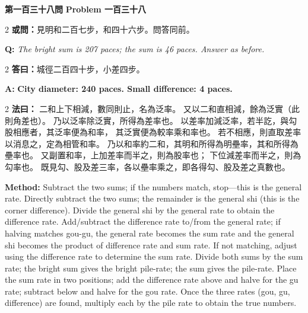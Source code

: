 \documentclass[11pt,a4paper]{article}
\newcommand{\wen}[1]{%
  \par\vspace{0.5em}%
  \noindent\textcolor{problemcolor}{\textbf{第#1問}}%
  \hfill\textcolor{problemcolor}{\textbf{Problem #1}}\par\nopagebreak%
  \vspace{0.3em}%
}
\newcommand{\owen}[1]{%
  \noindent\textcolor{problemcolor}{\textbf{或問：}}{\tradfont #1}\par\nopagebreak%
}
\newcommand{\oweneng}[1]{%
  \noindent\textcolor{engcolor}{\textbf{Q: }}{\itshape #1}\par\nopagebreak%
}
\newcommand{\fayue}[1]{%
  \noindent\textcolor{methodcolor}{\textbf{法曰：}}{\tradfont #1}\par\nopagebreak%
}
\newcommand{\fayueeng}[1]{%
  \noindent\textcolor{engcolor}{\textbf{Method: }}{#1}\par\nopagebreak%
}
\newcommand{\dayue}[1]{%
  \noindent\textcolor{anscolor}{\textbf{答曰：}}{\tradfont #1}\par\nopagebreak%
}
\newcommand{\dayueeng}[1]{%
  \noindent\textcolor{engcolor}{\textbf{A: }}{\bfseries #1}\par\nopagebreak%
}
\begin{document}
\vspace{0.5cm}

\wen{一百三十八}

\begin{paracol}{2}
\owen{見明和二百七步，和四十六步。問答同前。}
\switchcolumn
\oweneng{The bright sum is 207 paces; the sum is 46 paces. Answer as before.}
\end{paracol}

\begin{paracol}{2}
\dayue{城徑二百四十步，小差四步。}
\switchcolumn
\dayueeng{City diameter: 240 paces. Small difference: 4 paces.}
\end{paracol}

\begin{paracol}{2}
\fayue{%
二和上下相減，數同則止，名為泛率。
又以二和直相減，餘為泛實（此則角差也）。
乃以泛率除泛實，所得為差率也。
以差率加減泛率，若半訖，與勾股相應者，其泛率便為和率，
其泛實便為較率乘和率也。
若不相應，則直取差率以消息之，定為相管和率。
乃以和率約二和，其明和所得為明壘率，其和所得為壘率也。
又副置和率，上加差率而半之，則為股率也；
下位減差率而半之，則為勾率也。
既見勾、股及差三率，各以壘率乘之，即各得勾、股及差之真數也。}
\switchcolumn
\fayueeng{%
Subtract the two sums; if the numbers match, stop---this is the general rate. Directly subtract the two sums; the remainder is the general shi (this is the corner difference). Divide the general shi by the general rate to obtain the difference rate. Add/subtract the difference rate to/from the general rate; if halving matches gou-gu, the general rate becomes the sum rate and the general shi becomes the product of difference rate and sum rate. If not matching, adjust using the difference rate to determine the sum rate. Divide both sums by the sum rate; the bright sum gives the bright pile-rate; the sum gives the pile-rate. Place the sum rate in two positions; add the difference rate above and halve for the gu rate; subtract below and halve for the gou rate. Once the three rates (gou, gu, difference) are found, multiply each by the pile rate to obtain the true numbers.}
\end{paracol}
\end{document}

